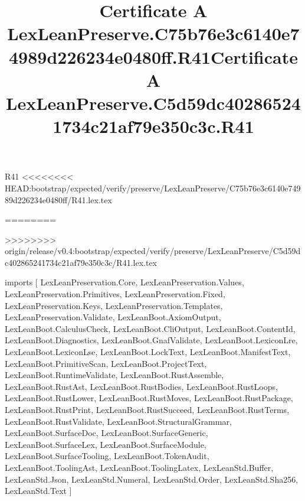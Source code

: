 \begin{lexlean}{R41}
<<<<<<<< HEAD:bootstrap/expected/verify/preserve/LexLeanPreserve/C75b76e3c6140e74989d226234e0480ff/R41.lex.tex
\title{Certificate A LexLeanPreserve.C75b76e3c6140e74989d226234e0480ff.R41}
========
\title{Certificate A LexLeanPreserve.C5d59dc402865241734c21af79e350c3c.R41}
>>>>>>>> origin/release/v0.4:bootstrap/expected/verify/preserve/LexLeanPreserve/C5d59dc402865241734c21af79e350c3c/R41.lex.tex
\begin{coremodule}
imports [
  LexLeanPreservation.Core,
  LexLeanPreservation.Values,
  LexLeanPreservation.Primitives,
  LexLeanPreservation.Fixed,
  LexLeanPreservation.Keys,
  LexLeanPreservation.Templates,
  LexLeanPreservation.Validate,
  LexLeanBoot.AxiomOutput,
  LexLeanBoot.CalculusCheck,
  LexLeanBoot.CliOutput,
  LexLeanBoot.ContentId,
  LexLeanBoot.Diagnostics,
  LexLeanBoot.GnafValidate,
  LexLeanBoot.LexiconLre,
  LexLeanBoot.LexiconLse,
  LexLeanBoot.LockText,
  LexLeanBoot.ManifestText,
  LexLeanBoot.PrimitiveScan,
  LexLeanBoot.ProjectText,
  LexLeanBoot.RuntimeValidate,
  LexLeanBoot.RustAssemble,
  LexLeanBoot.RustAst,
  LexLeanBoot.RustBodies,
  LexLeanBoot.RustLoops,
  LexLeanBoot.RustLower,
  LexLeanBoot.RustMoves,
  LexLeanBoot.RustPackage,
  LexLeanBoot.RustPrint,
  LexLeanBoot.RustSucceed,
  LexLeanBoot.RustTerms,
  LexLeanBoot.RustValidate,
  LexLeanBoot.StructuralGrammar,
  LexLeanBoot.SurfaceDoc,
  LexLeanBoot.SurfaceGeneric,
  LexLeanBoot.SurfaceLex,
  LexLeanBoot.SurfaceModule,
  LexLeanBoot.SurfaceTooling,
  LexLeanBoot.TokenAudit,
  LexLeanBoot.ToolingAst,
  LexLeanBoot.ToolingLatex,
  LexLeanStd.Buffer,
  LexLeanStd.Json,
  LexLeanStd.Numeral,
  LexLeanStd.Order,
  LexLeanStd.Sha256,
  LexLeanStd.Text
]


\end{coremodule}
\end{lexlean}

